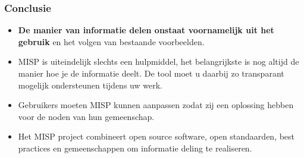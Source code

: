 \begin{frame}
        \frametitle{Conclusie}
        \begin{itemize}
                \item {\bf De manier van informatie delen onstaat voornamelijk uit het gebruik} en het volgen van bestaande voorbeelden.
                \item MISP is uiteindelijk slechts een hulpmiddel, het belangrijkste is nog altijd de manier hoe je de informatie deelt. De tool moet u daarbij zo transparant mogelijk ondersteunen tijdens uw werk.
                \item Gebruikers moeten MISP kunnen aanpassen zodat zij een oplossing hebben voor de noden van hun gemeenschap.
                \item Het MISP project combineert open source software, open standaarden, best practices en gemeenschappen om informatie deling te realiseren.
        \end{itemize}
\end{frame}

